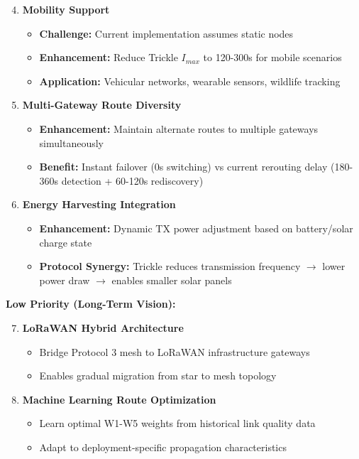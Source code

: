 \begin{enumerate}
\setcounter{enumi}{3}
\item \textbf{Mobility Support}
   \begin{itemize}
   \item \textbf{Challenge:} Current implementation assumes static nodes
   \item \textbf{Enhancement:} Reduce Trickle $I_{max}$ to 120-300s for mobile scenarios
   \item \textbf{Application:} Vehicular networks, wearable sensors, wildlife tracking
   \end{itemize}

\item \textbf{Multi-Gateway Route Diversity}
   \begin{itemize}
   \item \textbf{Enhancement:} Maintain alternate routes to multiple gateways simultaneously
   \item \textbf{Benefit:} Instant failover (0s switching) vs current rerouting delay (180-360s detection + 60-120s rediscovery)
   \end{itemize}

\item \textbf{Energy Harvesting Integration}
   \begin{itemize}
   \item \textbf{Enhancement:} Dynamic TX power adjustment based on battery/solar charge state
   \item \textbf{Protocol Synergy:} Trickle reduces transmission frequency $\rightarrow$ lower power draw $\rightarrow$ enables smaller solar panels
   \end{itemize}
\end{enumerate}

\textbf{Low Priority (Long-Term Vision):}

\begin{enumerate}
\setcounter{enumi}{6}
\item \textbf{LoRaWAN Hybrid Architecture}
   \begin{itemize}
   \item Bridge Protocol 3 mesh to LoRaWAN infrastructure gateways
   \item Enables gradual migration from star to mesh topology
   \end{itemize}

\item \textbf{Machine Learning Route Optimization}
   \begin{itemize}
   \item Learn optimal W1-W5 weights from historical link quality data
   \item Adapt to deployment-specific propagation characteristics
   \end{itemize}
\end{enumerate}

